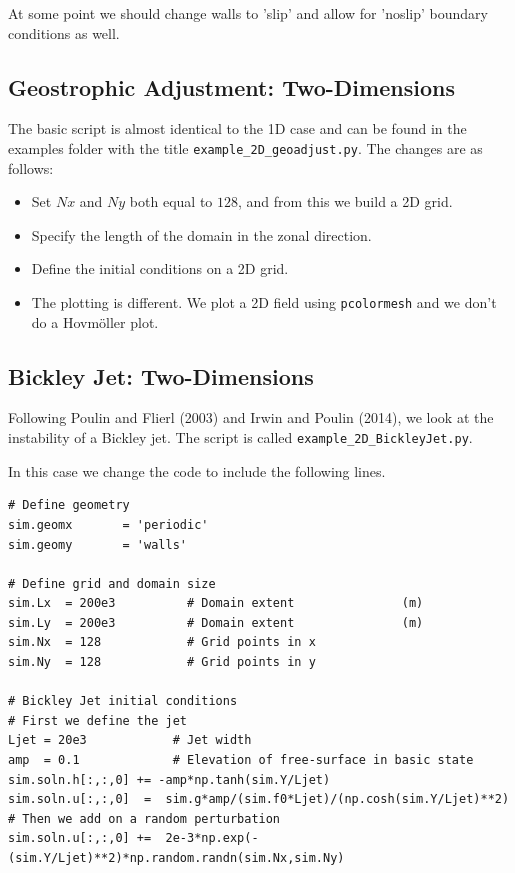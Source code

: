 \documentclass[11pt]{article}
\begin{document}
At some point we should change walls to 'slip' and allow for 'noslip' boundary conditions as well.

\subsection*{Geostrophic Adjustment: Two-Dimensions}

The basic script is almost identical to the 1D case and can be found in the examples folder with the title {\tt example\_2D\_geoadjust.py}.  The changes are as follows:
\begin{itemize}
\item Set $Nx$ and $Ny$ both equal to $128$, and from this we build a 2D grid.   
\item Specify the length of the domain in the zonal direction.
\item Define the initial conditions on a 2D grid.
\item The plotting is different.  We plot a 2D field using {\tt pcolormesh} and we don't do a Hovm\"oller plot.
\end{itemize}

\subsection*{Bickley Jet: Two-Dimensions}

Following Poulin and Flierl (2003) and Irwin and Poulin (2014), we look at the instability of a Bickley jet.  The script is called {\tt example\_2D\_BickleyJet.py}.

In this case we change the code to include the following lines.
\begin{lstlisting}
# Define geometry
sim.geomx       = 'periodic'
sim.geomy       = 'walls'

# Define grid and domain size
sim.Lx  = 200e3          # Domain extent               (m)
sim.Ly  = 200e3          # Domain extent               (m)
sim.Nx  = 128            # Grid points in x
sim.Ny  = 128            # Grid points in y

# Bickley Jet initial conditions
# First we define the jet
Ljet = 20e3            # Jet width
amp  = 0.1             # Elevation of free-surface in basic state
sim.soln.h[:,:,0] += -amp*np.tanh(sim.Y/Ljet)
sim.soln.u[:,:,0]  =  sim.g*amp/(sim.f0*Ljet)/(np.cosh(sim.Y/Ljet)**2)
# Then we add on a random perturbation
sim.soln.u[:,:,0] +=  2e-3*np.exp(-(sim.Y/Ljet)**2)*np.random.randn(sim.Nx,sim.Ny)
\end{lstlisting}

\end{document}
